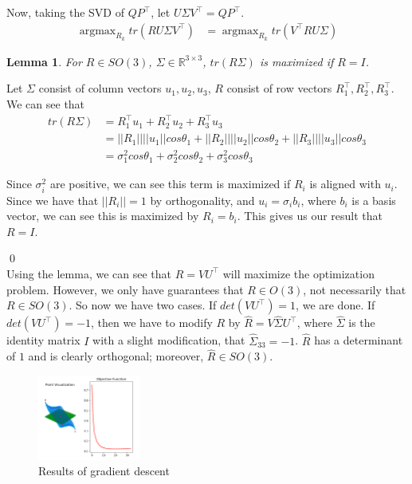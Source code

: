 \documentclass[a4paper]{article}
\DeclareMathOperator*{\argmax}{argmax}
\newtheorem{lemma}[theorem]{Lemma}
\begin{document}
Now, taking the SVD of $Q P^\intercal$, let $U \Sigma V^\intercal = Q P^\intercal$.
\begin{align*}
    \argmax_{R_k} tr(R U \Sigma V^\intercal) &= \argmax_{R_k} tr(V^\intercal R U \Sigma)
\end{align*}

\begin{lemma} For $R \in SO(3)$, $\Sigma \in \mathbb{R}^{3 \times 3}$, $tr(R \Sigma)$ is maximized if $R = I$.
\end{lemma}

Let $\Sigma$ consist of column vectors $u_1, u_2, u_3$, $R$ consist of row vectors $R_1^\intercal, R_2^\intercal, R_3^\intercal$. We can see that
\begin{align*}
    tr(R \Sigma) &= R_1^\intercal u_1 + R_2^\intercal u_2 + R_3^\intercal u_3 \\
    &= ||R_1||||u_1|| cos \theta_1 + ||R_2||||u_2|| cos \theta_2 + ||R_3||||u_3|| cos \theta_3 \\
    &= \sigma_1^2 cos \theta_1 + \sigma_2^2 cos \theta_2 + \sigma_3^2 cos \theta_3
\end{align*}

Since $\sigma_i^2$ are positive, we can see this term is maximized if $R_i$ is aligned with $u_i$. Since we have that $||R_i|| = 1$ by orthogonality, and $u_i = \sigma_i b_i$, where $b_i$ is a basis vector, we can see this is maximized by $R_i = b_i$. This gives us our result that $R = I$.

\qed \\

Using the lemma, we can see that $R = V U^\intercal$ will maximize the optimization problem. However, we only have guarantees that $R \in O(3)$, not necessarily that $R \in SO(3)$. So now we have two cases. If $det(V U^\intercal) = 1$, we are done. If $det(V U^\intercal) = -1$, then we have to modify $R$ by $\hat R = V \hat \Sigma U^\intercal$, where $\hat \Sigma$ is the identity matrix $I$ with a slight modification, that $\hat \Sigma_{33} = -1$. $\hat R$ has a determinant of $1$ and is clearly orthogonal; moreover, $\hat R \in SO(3)$. \\

\begin{figure}[!h]
\centering
\includegraphics[width=0.3\textwidth]{cs395t_graphics_hw2_alternating.png}
\caption{Results of gradient descent}
\end{figure}
\end{document}
